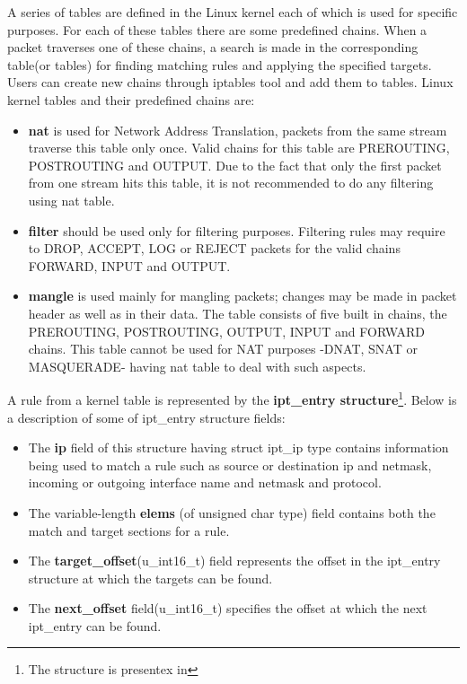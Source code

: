 {{A series of tables are defined in the Linux kernel each of which is used for specific purposes. For each of these tables there are some predefined chains. When a packet traverses one of these chains, a search is made in the corresponding table(or tables) for finding matching rules and applying the specified targets. Users can create new chains through iptables tool and add them to tables.
Linux kernel tables and their predefined chains are:       
\begin{itemize}
\item {\bf nat} is used for Network Address Translation, packets from the same stream traverse this table only once. Valid chains for this table are PREROUTING, POSTROUTING and OUTPUT. Due to the fact that only the first packet from one stream hits this table, it is not recommended to do any filtering using nat table.
\item {\bf filter} should be used only for filtering purposes. Filtering rules may require to DROP, ACCEPT, LOG or REJECT packets for the valid chains FORWARD, INPUT and OUTPUT.
\item {\bf mangle} is used mainly for mangling packets; changes may be made in packet header as well as in their data. The table consists of five built in chains, the PREROUTING, POSTROUTING, OUTPUT, INPUT and FORWARD chains. This table cannot be used for NAT purposes -DNAT, SNAT or MASQUERADE- having nat table to deal with such aspects. 
\end{itemize}

A rule from a kernel table is represented by the \textbf{ipt_entry structure}\footnote{The structure is presentex in }. 
Below is a description of some of ipt_entry structure fields:
\begin{itemize}
\item The \textbf{ip} field of this structure having struct ipt_ip type contains information being used to match a rule such as source or destination ip and netmask, incoming or outgoing interface name and netmask and protocol. \item The variable-length \textbf{elems} (of unsigned char type) field contains both the match and target sections for a rule. 
\item The \textbf{target_offset}(u_int16_t) field represents the offset in the ipt_entry structure at which the targets can be found. 
\item The \textbf{next_offset} field(u_int16_t) specifies the offset at which the next ipt_entry can be found.   
\end{itemize}

}}
